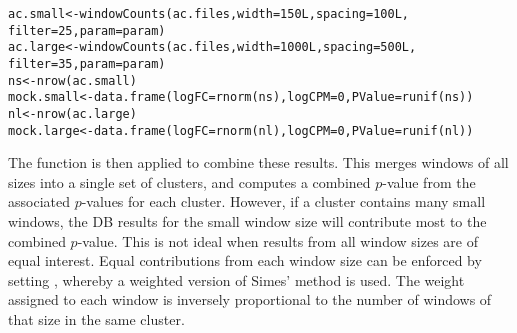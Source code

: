 \documentclass{report}\usepackage[]{graphicx}\usepackage[usenames,dvipsnames]{color}
\newcommand{\hlnum}[1]{\textcolor[rgb]{0.816,0.125,0.439}{#1}}%
\newcommand{\hlstd}[1]{\textcolor[rgb]{0.251,0.251,0.251}{#1}}%
\newcommand{\hlkwb}[1]{\textcolor[rgb]{0,0,0}{#1}}%
\newcommand{\hlkwc}[1]{\textcolor[rgb]{0.251,0.251,0.251}{#1}}%
\newcommand{\hlkwd}[1]{\textcolor[rgb]{0.878,0.439,0.125}{#1}}%
\newenvironment{knitrout}{}{} %
\begin{document}
\begin{knitrout}
\color{fgcolor}\begin{kframe}
\begin{alltt}
\hlstd{ac.small} \hlkwb{<-} \hlkwd{windowCounts}\hlstd{(ac.files,} \hlkwc{width}\hlstd{=}\hlnum{150L}\hlstd{,} \hlkwc{spacing}\hlstd{=}\hlnum{100L}\hlstd{,}
                         \hlkwc{filter}\hlstd{=}\hlnum{25}\hlstd{,} \hlkwc{param}\hlstd{=param)}
\hlstd{ac.large} \hlkwb{<-} \hlkwd{windowCounts}\hlstd{(ac.files,} \hlkwc{width}\hlstd{=}\hlnum{1000L}\hlstd{,} \hlkwc{spacing}\hlstd{=}\hlnum{500L}\hlstd{,}
                         \hlkwc{filter}\hlstd{=}\hlnum{35}\hlstd{,} \hlkwc{param}\hlstd{=param)}
\hlstd{ns} \hlkwb{<-} \hlkwd{nrow}\hlstd{(ac.small)}
\hlstd{mock.small} \hlkwb{<-} \hlkwd{data.frame}\hlstd{(}\hlkwc{logFC}\hlstd{=}\hlkwd{rnorm}\hlstd{(ns),} \hlkwc{logCPM}\hlstd{=}\hlnum{0}\hlstd{,} \hlkwc{PValue}\hlstd{=}\hlkwd{runif}\hlstd{(ns))}
\hlstd{nl} \hlkwb{<-} \hlkwd{nrow}\hlstd{(ac.large)}
\hlstd{mock.large} \hlkwb{<-} \hlkwd{data.frame}\hlstd{(}\hlkwc{logFC}\hlstd{=}\hlkwd{rnorm}\hlstd{(nl),} \hlkwc{logCPM}\hlstd{=}\hlnum{0}\hlstd{,} \hlkwc{PValue}\hlstd{=}\hlkwd{runif}\hlstd{(nl))}
\end{alltt}
\end{kframe}
\end{knitrout}

The  function is then applied to combine these results.
This merges windows of all sizes into a single set of clusters, and computes a combined $p$-value from the associated $p$-values for each cluster.
However, if a cluster contains many small windows, the DB results for the small window size will contribute most to the combined $p$-value.
This is not ideal when results from all window sizes are of equal interest.
Equal contributions from each window size can be enforced by setting , whereby a weighted version of Simes' method \cite{benjamini1997} is used.
The weight assigned to each window is inversely proportional to the number of windows of that size in the same cluster.
\end{document}
